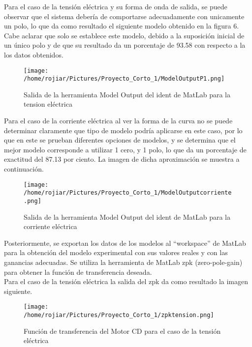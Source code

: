 \documentclass[a4paper,10pt,twocolumn]{article}
\begin{document}
Para el caso de la tensión eléctrica y su forma de onda de salida, se puede observar que el sistema debería de comportarse adecuadamente con unicamente
un polo, lo que da como resultado el siguiente modelo obtenido en la figura 6. Cabe aclarar que solo se establece este modelo, debido a la suposición inicial de un único
polo y de que su resultado da un porcentaje de 93.58 con respecto a la los datos obtenidos.

\begin{figure}[h]
\centering
\texttt{[image: /home/rojiar/Pictures/Proyecto\_Corto\_1/ModelOutputP1.png]}
\caption{Salida de la herramienta Model Output del ident de MatLab para la tension eléctrica}
\label{Salida de la herramienta Model Output del ident de MatLab para la tension electrica}
\end{figure}

\newpage

Para el caso de la corriente eléctrica al ver la forma de la curva no se puede determinar claramente que tipo de modelo podría aplicarse en este caso,
por lo que en este se prueban diferentes opciones de modelos, y se determina que el mejor modelo corresponde a utilizar 1 cero, y 1 polo, lo que da
un porcentaje de exactitud del 87.13 por ciento. La imagen de dicha aproximación se muestra a continuación.


\begin{figure}[h]
\centering
\texttt{[image: /home/rojiar/Pictures/Proyecto\_Corto\_1/ModelOutputcorriente.png]}
\caption{Salida de la herramienta Model Output del ident de MatLab para la corriente eléctrica}
\label{Salida de la herramienta Model Output del ident de MatLab para la corriente electrica}
\end{figure}

Posteriormente, se exportan los datos de los modelos al ``workspace'' de MatLab para la obtención del modelo experimental con sus valores reales
y con las ganancias adecuadas. Se utiliza la herramienta de MatLab zpk (zero-pole-gain) para obtener la función de transferencia deseada.\\

Para el caso de la tensión eléctrica la salida del zpk da como resultado la imagen siguiente.

\begin{figure}[h!]
\centering
\texttt{[image: /home/rojiar/Pictures/Proyecto\_Corto\_1/zpktension.png]}
\caption{Función de transferencia del Motor CD para el caso de la tensión eléctrica}
\label{Funcion de transferencia del Motor CD para el caso de la tension electrica}
\end{figure}
\end{document}
